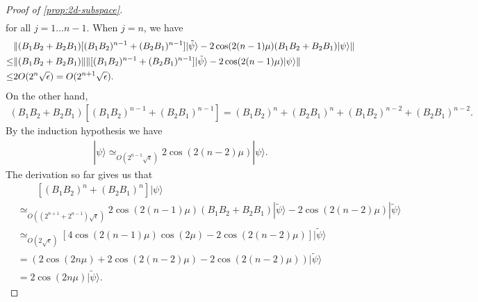 \documentclass[11pt,letterpaper]{article}
\newcommand{\ket}[1]{|#1\rangle}
\DeclarePairedDelimiter{\norm}{\lVert}{\rVert}
\newcommand{\1}{\mathbb{1}}
\newcommand{\tpsi}{\tilde{\psi}}
\newcommand{\appd}[1]{\simeq_{#1}}
\theoremstyle{definition}
\begin{document}
\begin{proof}[Proof of \cref{prop:2d-subspace}]
\begin{align}
	\end{align}
	for all $j =1\dots n-1$.
	When $j=n$, we have
	\begin{align}
		&\norm{ (B_1B_2+B_2B_1)[(B_1B_2)^{n-1} + (B_2B_1)^{n-1}]\ket{\tpsi} - 2\cos(2(n-1)\mu)(B_1B_2+B_2B_1)\ket{\psi}}\\
		\leq& \norm{(B_1B_2+B_2B_1)} \norm{ [(B_1B_2)^{n-1} + (B_2B_1)^{n-1}]\ket{\tpsi} - 2\cos(2(n-1)\mu)\ket{\psi}}\\
		\leq & 2 O(2^{n} \sqrt{\epsilon}) = O(2^{n+1} \sqrt{\epsilon}).
	\end{align}
	On the other hand,
	\begin{align}
		 (B_1B_2+B_2B_1)[(B_1B_2)^{n-1} + (B_2B_1)^{n-1}] = 
		 (B_1B_2)^{n} + (B_2B_1)^{n}+ (B_1B_2)^{n-2} + (B_2B_1)^{n-2}.
	\end{align}
	By the induction hypothesis we have 
	\begin{align}
		[(B_1B_2)^{n-2} + (B_2B_1)^{n-2}] \ket{\psi} \appd{O(2^{n-1} \sqrt{\epsilon})} 2\cos(2(n-2)\mu) \ket{\psi}.
	\end{align}
	The derivation so far gives us that
	\begin{align}
		&\qquad[(B_1B_2)^{n} + (B_2B_1)^{n}] \ket{\psi} \\
		&\appd{O((2^{n+1}+2^{n-1})\sqrt{\epsilon})} 2\cos(2(n-1)\mu)(B_1B_2+B_2B_1)\ket{\tpsi} - 2\cos(2(n-2)\mu) \ket{\tpsi}\\
		&\appd{O(2\sqrt{\epsilon})} [4\cos(2(n-1)\mu)\cos(2\mu) - 2\cos(2(n-2)\mu)]\ket{\tpsi}\\
		&= (2\cos(2n\mu) + 2\cos(2(n-2)\mu) - 2\cos(2(n-2)\mu))\ket{\tpsi}\\
		&=2\cos(2n\mu) \ket{\tpsi}.
	\end{align}
	

\end{proof}
\end{document}
